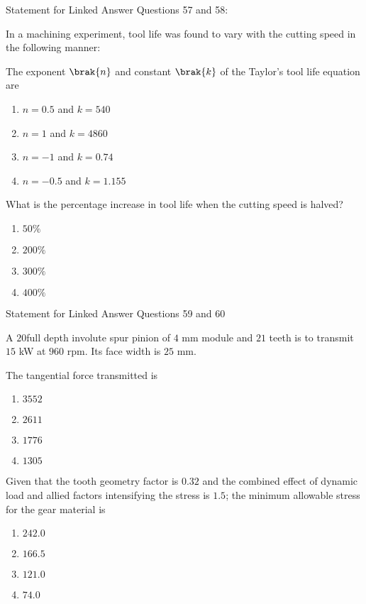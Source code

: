    

    Statement for Linked Answer Questions 57 and 58:
    
    In a machining experiment, tool life was found to vary with the cutting speed in the following manner:
    
    
    \item The exponent $\brak{n}$ and constant $\brak{k}$ of the Taylor's tool life equation are
    \begin{enumerate}
        \item $n = 0.5$ and $k = 540$
        \item $n = 1$ and $k = 4860$
        \item $n = -1$ and $k = 0.74$
        \item $n = -0.5$ and $k = 1.155$
    \end{enumerate}
    \item  What is the percentage increase in tool life when the cutting speed is halved?
    \begin{enumerate}
        \item $50\%$
        \item $200\%$
        \item $300\%$
        \item $400\%$
    \end{enumerate}

 Statement for Linked Answer Questions 59 and 60
    
  \item   A $20$\degree full depth involute spur pinion of $4$ mm module and $21$ teeth is to transmit $15$ kW at $960$ rpm. Its face width is $25$ mm.

    \item  The tangential force transmitted  is
    \begin{enumerate}
        \item $3552$
        \item $2611$
        \item $1776$
        \item $1305$
    \end{enumerate}

    \item  Given that the tooth geometry factor is $0.32$ and the combined effect of dynamic load and allied factors intensifying the stress is $1.5$; the minimum allowable stress  for the gear material is
    \begin{enumerate}
        \item $242.0$
        \item $166.5$
        \item $121.0$
        \item $74.0$
    \end{enumerate}

